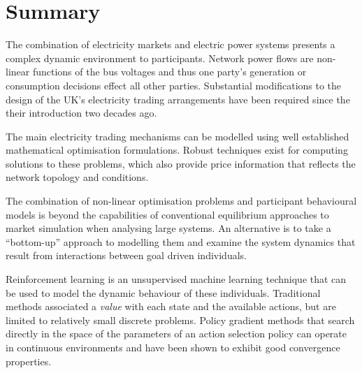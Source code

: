 \section{Summary}
The combination of electricity markets and electric power systems presents a
complex dynamic environment to participants.  Network power flows are
non-linear functions of the bus voltages and thus one party's generation or
consumption decisions effect all other parties.  Substantial modifications to
the design of the UK's electricity trading arrangements have been required
since the their introduction two decades ago.

The main electricity trading mechanisms can be modelled using well established
mathematical optimisation formulations.  Robust techniques exist for computing
solutions to these problems, which also provide price information that reflects
the network topology and conditions.

The combination of non-linear optimisation problems and participant behavioural
models is beyond the capabilities of conventional equilibrium approaches to
market simulation when analysing large systems.  An alternative is to take a
``bottom-up'' approach to modelling them and examine the system dynamics that
result from interactions between goal driven individuals.

Reinforcement learning is an unsupervised machine learning technique that can
be used to model the dynamic behaviour of these individuals.  Traditional
methods associated a \textit{value} with each state and the available actions,
but are limited to relatively small discrete problems.  Policy gradient
methods that search directly in the space of the parameters of an action selection
policy can operate in continuous environments and have been shown to
exhibit good convergence properties.
